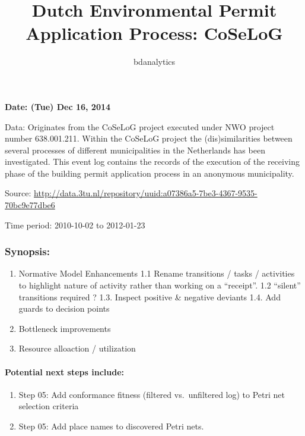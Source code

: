 \documentclass[]{article}
\title{Dutch Environmental Permit Application Process: CoSeLoG}
\author{bdanalytics}
\date{}
\begin{document}
\maketitle


{
\hypersetup{linkcolor=black}
\setcounter{tocdepth}{2}
\tableofcontents
}
\textbf{Date: (Tue) Dec 16, 2014}

Data: Originates from the CoSeLoG project executed under NWO project
number 638.001.211. Within the CoSeLoG project the (dis)similarities
between several processes of different municipalities in the Netherlands
has been investigated. This event log contains the records of the
execution of the receiving phase of the building permit application
process in an anonymous municipality.

Source:
\url{http://data.3tu.nl/repository/uuid:a07386a5-7be3-4367-9535-70bc9e77dbe6}

Time period: 2010-10-02 to 2012-01-23

\subsubsection{Synopsis:}\label{synopsis}

\begin{enumerate}
\def\labelenumi{\arabic{enumi}.}
\item
  Normative Model Enhancements 1.1 Rename transitions / tasks /
  activities to highlight nature of activity rather than working on a
  ``receipt''. 1.2 ``silent'' transitions required ? 1.3. Inspect
  positive \& negative deviants 1.4. Add guards to decision points
\item
  Bottleneck improvements
\item
  Resource alloaction / utilization
\end{enumerate}

\paragraph{Potential next steps
include:}\label{potential-next-steps-include}

\begin{enumerate}
\def\labelenumi{\arabic{enumi}.}
\itemsep1pt\parskip0pt
\item
  Step 05: Add conformance fitness (filtered vs.~unfiltered log) to
  Petri net selection criteria
\item
  Step 05: Add place names to discovered Petri nets.
\end{enumerate}
\end{document}
